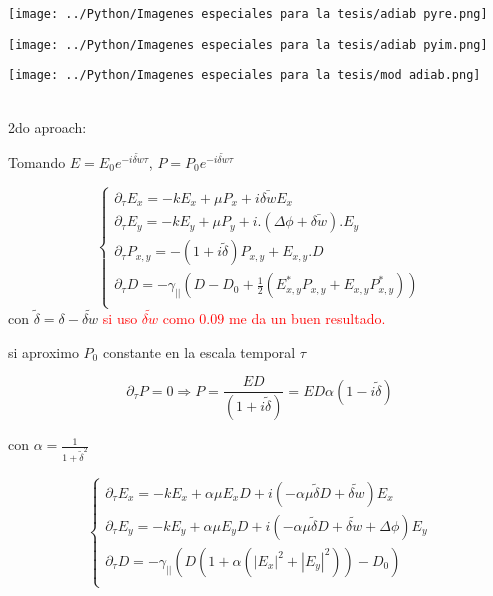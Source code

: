 	\begin{minipage}{0.33\textwidth}
		\centering
		\texttt{[image: ../Python/Imagenes especiales para la tesis/adiab pyre.png]}
	\end{minipage}
	\begin{minipage}{0.33\textwidth}
		\centering
		\texttt{[image: ../Python/Imagenes especiales para la tesis/adiab pyim.png]}
	\end{minipage}
	\begin{minipage}{0.33\textwidth}
		\centering
		\texttt{[image: ../Python/Imagenes especiales para la tesis/mod adiab.png]}
	\end{minipage}\\
	
	2do aproach:
	
	Tomando $E=E_0 e^{-i\tilde{\delta w} \tau }$, $P=P_0 e^{-i\tilde{\delta w} \tau }$
	
	\[
	\begin{cases}
	\partial_{\tau} E_x=-k E_x + \mu P_x + i\bar{\delta w} E_x \\
	\partial_{\tau} E_y=-k E_y + \mu P_y + i.(\Delta \phi +\bar{\delta w}).E_y \\
	\partial_{\tau} P_{x,y}=-(1+i\tilde{\delta})P_{x,y}+E_{x,y}.D \\
	\partial_{\tau} D=-\gamma_{||}(D-D_0+\tfrac{1}{2}(E^*_{x,y}P_{x,y}+E_{x,y}P^*_{x,y})) \\
	\end{cases}
	\]
	con $\tilde{\delta}=\delta-\tilde{\delta w}$
	\textcolor{red}{si uso $\tilde{\delta w  }$ como $0.09$ me da un buen resultado.}
	
	si aproximo $P_0$ constante en la escala temporal $\tau$
	
	\[\partial_{\tau}P= 0 \Longrightarrow P=\frac{E D}{(1+i\tilde{\delta}  )}=E D \alpha(1-i\tilde{\delta} )	\]
	
	con $\alpha=\frac{1}{1+\tilde{\delta}^2}$
	
	\begin{equation}
		\begin{cases}
		\partial_{\tau} E_x=-k E_x + \alpha \mu E_x D + i(-\alpha \mu \tilde{\delta} D + \tilde{\delta w} ) E_x\\
		\partial_{\tau} E_y=-k E_y + \alpha \mu E_y D + i( -\alpha \mu \tilde{\delta} D +\tilde{\delta w}+\Delta \phi)E_y \\
		\partial_{\tau} D=-\gamma_{||}(D(1+\alpha(|E_x|^2+|E_y|^2))-D_0) \\
		\end{cases}
	    \label{eq: elim adiabatica}
	\end{equation}
		

